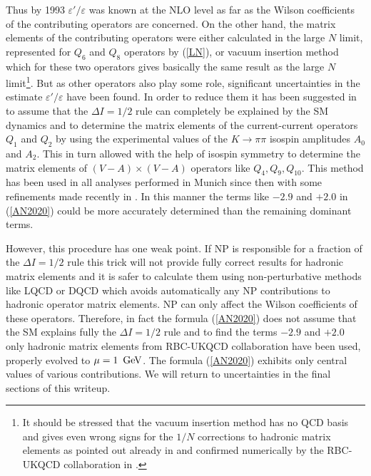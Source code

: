 \documentclass[12pt,a4paper]{article}
\newcommand{\gev}{\, {\rm GeV}}
\def\epe{\varepsilon'/\varepsilon}
\begin{document}
Thus by 1993 $\epe$ was known at the NLO level as far as the Wilson coefficients of the contributing operators are concerned. 
On the other hand, the matrix
elements of the contributing operators were either calculated in the large
$N$ limit, represented for $Q_6$ and $Q_8$ operators by (\ref{LN}), or vacuum insertion method which for these two operators gives basically the same result as  the large $N$ limit\footnote{It should be stressed that the vacuum insertion method has no QCD basis and gives even wrong signs for the $1/N$ corrections to hadronic matrix elements as pointed out already in \cite{Buras:1985yx,Bardeen:1986vp,Bardeen:1986uz,Bardeen:1986vz} and confirmed numerically by the RBC-UKQCD collaboration in \cite{Boyle:2012ys}.}.
 But as other operators also play some role, significant uncertainties in the estimate $\epe$ have been found.
In order to reduce them  it has been suggested in
\cite{Buras:1993dy} to assume that the $\Delta I=1/2$ rule can completely be
explained by the SM dynamics and to determine the matrix elements of the current-current
operators $Q_1$ and $Q_2$ by using the experimental values of the  $K\to\pi\pi$
isospin amplitudes $A_0$ and $A_2$. This in turn allowed with the help of isospin symmetry to determine  the
matrix elements of $(V-A)\times (V-A)$ operators like $Q_4,Q_9,Q_{10}$.
This method has been used in all analyses performed in Munich since then with
some refinements made recently in \cite{Buras:2015yba,Aebischer:2019mtr}. In this manner the terms like $-2.9$ and $+2.0$ in (\ref{AN2020}) could be  more accurately determined than the remaining dominant terms.

However, this procedure has one
weak point. If NP is responsible for a fraction of the $\Delta I=1/2$ rule
this trick will not provide fully correct results for hadronic matrix elements  and it is safer
to calculate them using  non-perturbative methods like
LQCD or DQCD 
which avoids automatically any NP contributions to hadronic operator  matrix elements. NP can only affect the Wilson coefficients of these operators.
Therefore, in fact the formula (\ref{AN2020}) does not assume that the SM
explains fully the  $\Delta I=1/2$ rule and to find the terms
$-2.9$ and $+2.0$ only hadronic matrix elements from RBC-UKQCD collaboration \cite{Abbott:2020hxn}
have been used, properly evolved to $\mu=1~\gev$. The formula (\ref{AN2020})
exhibits only central values of various contributions. We will return to uncertainties in the final sections of this writeup.
\end{document}
